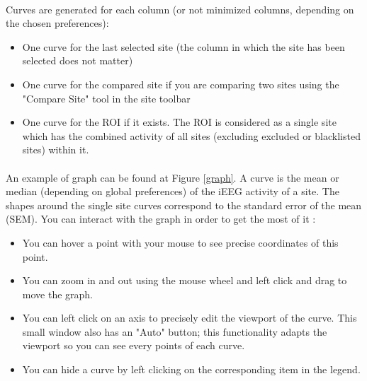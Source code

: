 \documentclass[a4paper]{article}
\begin{document}
\paragraph{} Curves are generated for each column (or not minimized columns, depending on the chosen preferences):
\begin{itemize}
\item One curve for the last selected site (the column in which the site has been selected does not matter)
\item One curve for the compared site if you are comparing two sites using the "Compare Site" tool in the site toolbar
\item One curve for the ROI if it exists. The ROI is considered as a single site which has the combined activity of all sites (excluding excluded or blacklisted sites) within it.
\end{itemize}
\paragraph{} An example of graph can be found at Figure \ref{graph}. A curve is the mean or median (depending on global preferences) of the iEEG activity of a site. The shapes around the single site curves correspond to the standard error of the mean (SEM). You can interact with the graph in order to get the most of it :
\begin{itemize}
\item You can hover a point with your mouse to see precise coordinates of this point.
\item You can zoom in and out using the mouse wheel and left click and drag to move the graph.
\item You can left click on an axis to precisely edit the viewport of the curve. This small window also has an "Auto" button; this functionality adapts the viewport so you can see every points of each curve.
\item You can hide a curve by left clicking on the corresponding item in the legend.
\end{itemize}
\end{document}

